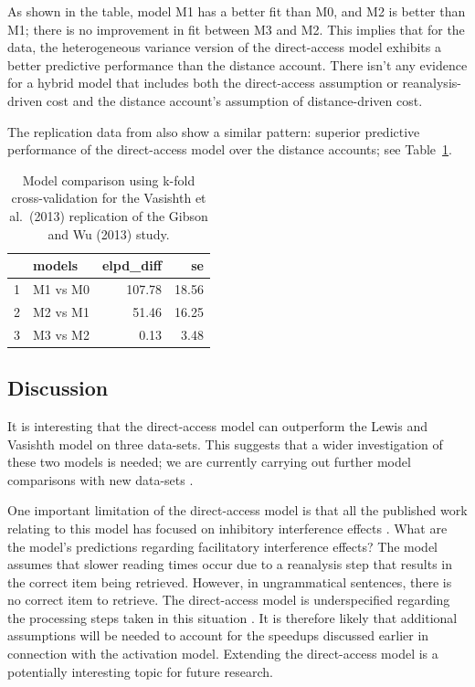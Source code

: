 \documentclass{cambridge7A}\usepackage[]{graphicx}\usepackage[]{color}
\begin{document}
As shown in the table, model M1 has  a better fit than M0, and M2 is better than M1; there is no improvement in fit between M3 and M2. This implies that for the \cite{gibsonwu} data, the heterogeneous variance version of the direct-access model exhibits a better predictive performance than the distance account. There isn't any evidence for a hybrid model that includes both the direct-access assumption or reanalysis-driven cost and the distance account's assumption of distance-driven cost.

The replication data from \cite{VasishthChenLi2013} also show a similar pattern: superior predictive performance of the direct-access model over the distance accounts; see Table~\ref{tab:modcompgibsonwurep}. 

\begin{table}[!htbp]
\centering
\begin{tabular}{rlrr}
  \hline
 & models & elpd\_diff & se \\ 
  \hline
1 & M1 vs M0 & 107.78 & 18.56 \\ 
  2 & M2 vs M1 & 51.46 & 16.25 \\
  3 & M3 vs M2 & 0.13 & 3.48 \\
   \hline
\end{tabular}
\caption{Model comparison using k-fold cross-validation for the Vasishth et al.\ (2013) replication of the Gibson and Wu (2013) study.} 
\label{tab:modcompgibsonwurep}
\end{table}

\subsection{Discussion}

It is interesting that the direct-access model can outperform the Lewis and Vasishth model on three data-sets. This suggests that a wider investigation of these two models is needed; we are currently carrying out further model comparisons with new data-sets \citep{LissonEtAl2020}.

One important limitation of the direct-access model is that all the published work relating to this model has focused on  inhibitory interference effects \citep{VasishthEtAlTiCS2019}. What are the model's predictions regarding  facilitatory interference effects? The model assumes that slower reading times occur due to a reanalysis step that results in the correct item being retrieved. However, in ungrammatical sentences, there is no correct item to retrieve. The direct-access model is underspecified regarding the processing steps taken in this situation \citep{NicenboimRetrieval2018}. It is therefore likely that additional assumptions will be needed to account for the speedups discussed earlier in connection with the activation model. Extending the direct-access model is a potentially interesting topic for future research.
\end{document}
